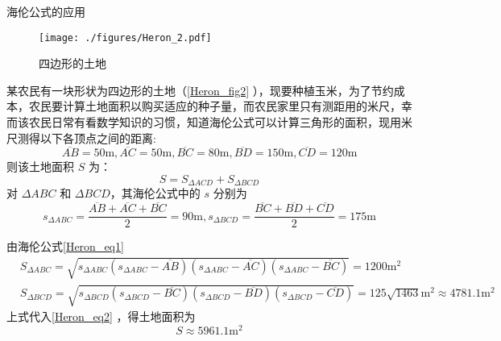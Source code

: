 \begin{example}{海伦公式的应用}
\begin{figure}[ht]
\centering
\texttt{[image: ./figures/Heron\_2.pdf]}
\caption{四边形的土地} \label{Heron_fig2}
\end{figure}
某农民有一块形状为四边形的土地（\autoref{Heron_fig2} ），现要种植玉米，为了节约成本，农民要计算土地面积以购买适应的种子量，而农民家里只有测距用的米尺，幸而该农民日常有看数学知识的习惯，知道海伦公式可以计算三角形的面积，现用米尺测得以下各顶点之间的距离:
\begin{equation}
\overline{AB}=50\mathrm{m},\overline{AC}=50\mathrm{m},\overline{BC}=80\mathrm{m},\overline{BD}=150\mathrm{m},\overline{CD}=120\mathrm{m}
\end{equation}
则该土地面积 $S$ 为：
\begin{equation}\label{Heron_eq2}
S=S_{\Delta ACD}+S_{\Delta BCD}
\end{equation}
对 $\Delta ABC$ 和 $\Delta BCD$，其海伦公式中的 $s$ 分别为
\begin{equation}
s_{\Delta ABC}=\frac{\overline{AB}+\overline{AC}+\overline{BC}}{2}=90\mathrm{m}
,
s_{\Delta BCD}=\frac{\overline{BC}+\overline{BD}+\overline{CD}}{2}=175\mathrm{m}
\end{equation}


由海伦公式\autoref{Heron_eq1} 
\begin{equation}
\begin{aligned}
&S_{\Delta ABC}=\sqrt{s_{\Delta ABC}(s_{\Delta ABC}-\overline{AB})(s_{\Delta ABC}-\overline{AC})(s_{\Delta ABC}-\overline{BC})}=1200\mathrm{m^2}
\\
&S_{\Delta BCD}=\sqrt{s_{\Delta BCD}(s_{\Delta BCD}-\overline{BC})(s_{\Delta BCD}-\overline{BD})(s_{\Delta BCD}-\overline{CD})}=125\sqrt{1463}\mathrm{m^2}\approx 4781.1\mathrm{m^2}
\end{aligned}
\end{equation}
上式代入\autoref{Heron_eq2} ，得土地面积为
\begin{equation}
S\approx 5961.1\mathrm{m^2}
\end{equation}
\end{example}
